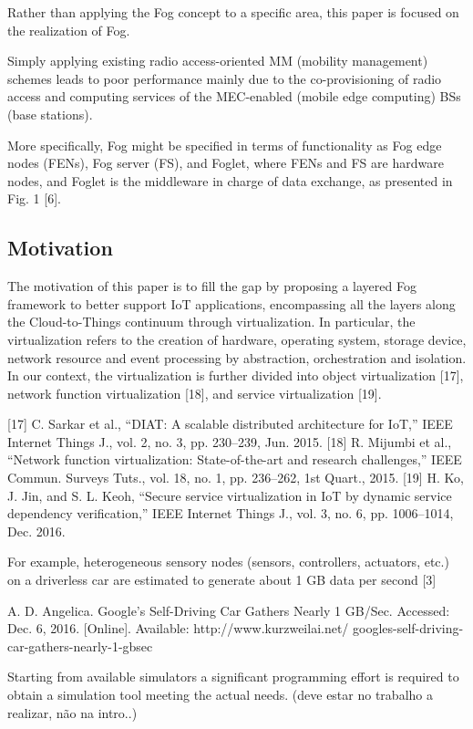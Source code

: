 Rather than applying
the Fog concept to a specific area, this paper is focused on
the realization of Fog.

Simply applying existing radio access-oriented
MM (mobility management) schemes leads to poor performance mainly due to the
co-provisioning of radio access and computing services of the
MEC-enabled (mobile edge computing) BSs (base stations).


More specifically, Fog might be specified in terms
of functionality as Fog edge nodes (FENs), Fog server (FS),
and Foglet, where FENs and FS are hardware nodes, and
Foglet is the middleware in charge of data exchange, as
presented in Fig. 1 [6].

\subsection{Motivation}
The motivation of this paper is to fill the gap by proposing
a layered Fog framework to better support IoT applications,
encompassing all the layers along the Cloud-to-Things continuum
through virtualization. In particular, the virtualization
refers to the creation of hardware, operating system, storage
device, network resource and event processing by abstraction,
orchestration and isolation. In our context, the virtualization is
further divided into object virtualization [17], network function
virtualization [18], and service virtualization [19].

[17] C. Sarkar et al., “DIAT: A scalable distributed architecture for IoT,”
IEEE Internet Things J., vol. 2, no. 3, pp. 230–239, Jun. 2015.
[18] R. Mijumbi et al., “Network function virtualization: State-of-the-art
and research challenges,” IEEE Commun. Surveys Tuts., vol. 18, no. 1,
pp. 236–262, 1st Quart., 2015.
[19] H. Ko, J. Jin, and S. L. Keoh, “Secure service virtualization in IoT
by dynamic service dependency verification,” IEEE Internet Things J.,
vol. 3, no. 6, pp. 1006–1014, Dec. 2016.

For example, heterogeneous sensory
nodes (sensors, controllers, actuators, etc.) on a driverless car
are estimated to generate about 1 GB data per second [3]

A. D. Angelica. Google’s Self-Driving Car Gathers Nearly 1 GB/Sec.
Accessed: Dec. 6, 2016. [Online]. Available: http://www.kurzweilai.net/
googles-self-driving-car-gathers-nearly-1-gbsec





Starting from available simulators a significant programming
effort is required to obtain a simulation tool meeting the actual
needs. (deve estar no trabalho a realizar, não na intro..)


